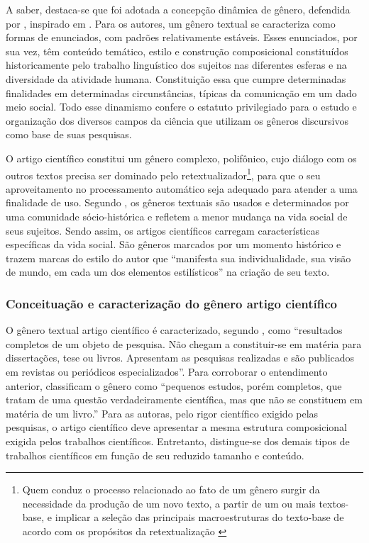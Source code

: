 \documentclass[portuguese]{textolivre}
\begin{document}
A saber, destaca-se que foi adotada a concepção dinâmica de gênero, defendida por \textcite[p. 21]{marcuschi_generos_2002}, inspirado em \textcite{bakhtin_estetica_1997}. Para os autores, um gênero textual se caracteriza como formas de enunciados, com padrões relativamente estáveis. Esses enunciados, por sua vez, têm conteúdo temático, estilo e construção composicional constituídos historicamente pelo trabalho linguístico dos sujeitos nas diferentes esferas e na diversidade da atividade humana. Constituição essa que cumpre determinadas finalidades em determinadas circunstâncias, típicas da comunicação em um dado meio social. Todo esse dinamismo confere o estatuto privilegiado para o estudo e organização dos diversos campos da ciência que utilizam os gêneros discursivos como base de suas pesquisas.

O artigo científico constitui um gênero complexo, polifônico, cujo diálogo com os outros textos precisa ser dominado pelo retextualizador\footnote{Quem conduz o processo relacionado ao fato de um gênero surgir da necessidade da produção de um novo texto, a partir de um ou mais textos-base, e implicar a seleção das principais macroestruturas do texto-base de acordo com os propósitos da retextualização \cite{matencio_atividade_2002}}, para que o seu aproveitamento no processamento automático seja adequado para atender a uma finalidade de uso. Segundo \textcite{bakhtin_estetica_1997}, os gêneros textuais são usados e determinados por uma comunidade sócio-histórica e refletem a menor mudança na vida social de seus sujeitos. Sendo assim, os artigos científicos carregam características específicas da vida social. São gêneros marcados por um momento histórico e trazem marcas do estilo do autor que “manifesta sua individualidade, sua visão de mundo, em cada um dos elementos estilísticos” \cite[p. 298]{bakhtin_estetica_1997} na criação de seu texto.

\subsubsection{Conceituação e caracterização do gênero artigo científico}\label{sec-modelo}
O gênero textual artigo científico é caracterizado, segundo \textcite[p. 71]{marcantonio_elaboracao_1993}, como “resultados completos de um objeto de pesquisa. Não chegam a constituir-se em matéria para dissertações, tese ou livros. Apresentam as pesquisas realizadas e são publicados em revistas ou periódicos especializados”. Para corroborar o entendimento anterior, \textcite[p. 84]{marconi_fundamentos_2010} classificam o gênero como “pequenos estudos, porém completos, que tratam de uma questão verdadeiramente científica, mas que não se constituem em matéria de um livro.”  Para as autoras, pelo rigor científico exigido pelas pesquisas, o artigo científico deve apresentar a mesma estrutura composicional exigida pelos trabalhos científicos. Entretanto, distingue-se dos demais tipos de trabalhos científicos em função de seu reduzido tamanho e conteúdo.
\end{document}
